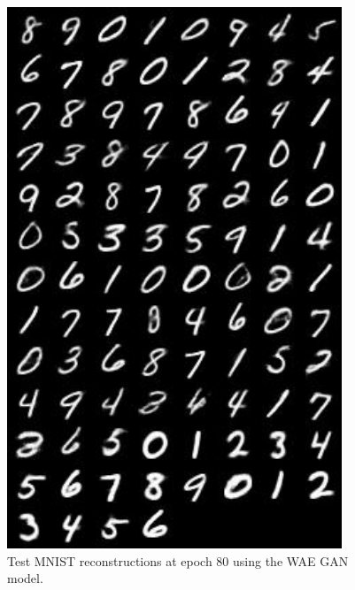 \documentclass[12pt,english]{amsart}
\theoremstyle{definition}
\begin{document}
\begin{figure}[h]
\includegraphics[width=100mm]{mnist_wae-gan_ep_79_recon}
\caption{Test MNIST reconstructions at epoch 80 using the WAE GAN model.}
\label{Figure 6}
\end{figure}
\end{document}

